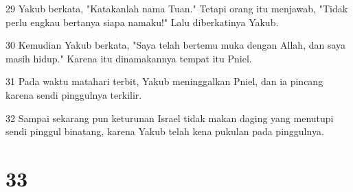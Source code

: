 \par 29 Yakub berkata, "Katakanlah nama Tuan." Tetapi orang itu menjawab, "Tidak perlu engkau bertanya siapa namaku!" Lalu diberkatinya Yakub.
\par 30 Kemudian Yakub berkata, "Saya telah bertemu muka dengan Allah, dan saya masih hidup." Karena itu dinamakannya tempat itu Pniel.
\par 31 Pada waktu matahari terbit, Yakub meninggalkan Pniel, dan ia pincang karena sendi pinggulnya terkilir.
\par 32 Sampai sekarang pun keturunan Israel tidak makan daging yang menutupi sendi pinggul binatang, karena Yakub telah kena pukulan pada pinggulnya.

\chapter{33}

